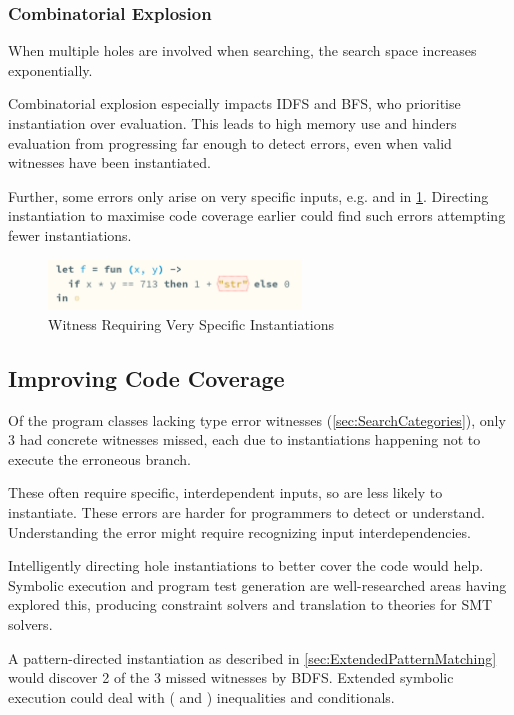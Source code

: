 \subsubsection{Combinatorial Explosion}
When multiple holes are involved when searching, the search space increases exponentially.

Combinatorial explosion especially impacts IDFS and BFS, who prioritise instantiation over evaluation. This leads to high memory use and hinders evaluation from progressing far enough to detect errors, even when valid witnesses have been instantiated.

Further, some errors only arise on very specific inputs, e.g.  and  in \cref{fig:SpecificInstantiations}. Directing instantiation to maximise code coverage earlier could find such errors attempting fewer instantiations.
\begin{figure}\centering
\includegraphics[width=0.6\textwidth]{Media/Figures/very_specific_error}
\caption{Witness Requiring Very Specific Instantiations}
\label{fig:SpecificInstantiations}
\end{figure}

\subsection{Improving Code Coverage}
\label{sec:EvalHoleInstantiation}
Of the program classes lacking type error witnesses (\cref{sec:SearchCategories}), only 3 had concrete witnesses missed, each due to instantiations happening not to execute the erroneous branch.

These often require specific, interdependent inputs, so are less likely to instantiate. These errors are harder for programmers to detect or understand. Understanding the error might require recognizing input interdependencies.

Intelligently directing hole instantiations to better cover the code would help. Symbolic execution and program test generation are well-researched areas having explored this, producing constraint solvers and translation to theories for SMT solvers.

A pattern-directed instantiation as described in \cref{sec:ExtendedPatternMatching} would discover 2 of the 3 missed witnesses by BDFS. Extended symbolic execution could deal with ( and ) inequalities and conditionals.


